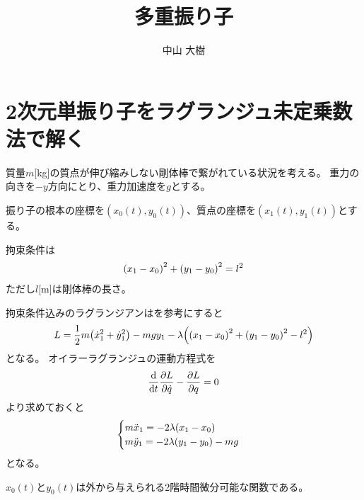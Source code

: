 \documentclass[uplatex]{jsarticle}
\title{多重振り子}
\author{中山 大樹}
\begin{document}
\maketitle

\section{2次元単振り子をラグランジュ未定乗数法で解く}

質量$m$[\si{kg}]の質点が伸び縮みしない剛体棒で繋がれている状況を考える。
重力の向きを$-y$方向にとり、重力加速度を$g$とする。

振り子の根本の座標を$(x_0(t), y_0(t))$、質点の座標を$(x_1(t), y_1(t))$とする。

拘束条件は
\begin{align}
    \qty(x_1 - x_0)^2 + \qty(y_1 - y_0)^2 = l^2  \label{2d_single_cons}
\end{align}
ただし$l$[\si{m}]は剛体棒の長さ。

拘束条件込みのラグランジアンは\cite{lagrangian}を参考にすると
\begin{align}
    L = \frac{1}{2} m \qty(\dot{x}_1^2 + \dot{y}_1^2) - mgy_1
        - \lambda \qty(\qty(x_1 - x_0)^2 + \qty(y_1 - y_0)^2 - l^2)
\end{align}
となる。
オイラーラグランジュの運動方程式を
\begin{align}
    \dv{}{t}\pdv{L}{\dot{q}} - \pdv{L}{q} = 0
\end{align}
より求めておくと
\begin{align}
\begin{cases}
    m \ddot{x}_1 = -2\lambda\qty(x_1 - x_0) \\
    m \ddot{y}_1 = -2\lambda\qty(y_1 - y_0) - mg
\end{cases}
\label{2d_single_eom}
\end{align}
となる。

$x_0(t)$と$y_0(t)$は外から与えられる2階時間微分可能な関数である。
\end{document}
